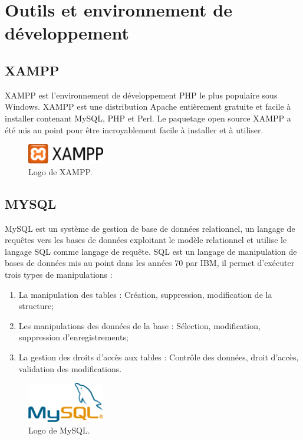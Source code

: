 \documentclass[french]{report}
\begin{document}
    \section{Outils et environnement de développement}
        \subsection{XAMPP}
        XAMPP est l'environnement de développement PHP le plus populaire sous Windows. 
	XAMPP est une distribution Apache entièrement gratuite et facile à installer contenant MySQL,
	PHP et Perl. Le paquetage open source XAMPP a été mis au point pour être incroyablement facile à installer et à utiliser.
        
        \begin{figure}[H]
            \centering
            \includegraphics[width=0.3\textwidth]{images/1024px-Xampp_logo.svg.png}
            \caption{Logo de XAMPP.}
            \label{fig:my_label}
        \end{figure}
        
        \subsection{MYSQL}
        
        MySQL est un système de gestion de base de données relationnel, un langage de 
	requêtes vers les bases de données exploitant le modèle relationnel et utilise 
	le langage SQL comme langage de requête. SQL est un langage de manipulation de 
	bases de données mis au point dans les années 70 par IBM, il permet d'exécuter
	trois types de manipulations \cite{memoire} :
        
        \begin{enumerate}
            \item La manipulation des tables : Création, suppression, modification de la structure;
            \item Les manipulations des données de la base : Sélection, modification, suppression d'enregistrements;
            \item La gestion des droits d’accès aux tables : Contrôle des données, droit d'accès, validation des modifications. 
        \end{enumerate}

        \begin{figure}[H]
            \centering
            \includegraphics[width=0.3\textwidth]{images/1200px-MySQL.svg.png}
            \caption{Logo de MySQL.}
            \label{fig:my_label}
        \end{figure}
        
\end{document}
